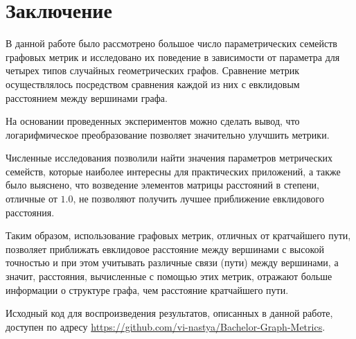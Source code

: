 \chapter*{Заключение}						%

В данной работе было рассмотрено большое число параметрических семейств графовых метрик и исследовано их поведение в зависимости от параметра для четырех типов случайных геометрических графов. Сравнение метрик осуществлялось посредством сравнения каждой из них с евклидовым расстоянием между вершинами графа.

На основании проведенных экспериментов можно сделать вывод, что логарифмическое преобразование позволяет значительно улучшить метрики.

Численные исследования позволили найти значения параметров метрических семейств, которые наиболее интересны для практических приложений, а также было выяснено, что возведение элементов матрицы расстояний в степени, отличные от $1.0$, не позволяют получить лучшее приближение евклидового расстояния.

Таким образом, использование графовых метрик, отличных от кратчайшего пути, позволяет приближать евклидовое расстояние между вершинами с высокой точностью и при этом учитывать различные связи (пути) между вершинами, а значит, расстояния, вычисленные с помощью этих метрик, отражают больше информации о структуре графа, чем расстояние кратчайшего пути.

Исходный код для воспроизведения результатов, описанных в данной работе, доступен по адресу \url{https://github.com/vi-nastya/Bachelor-Graph-Metrics}.
